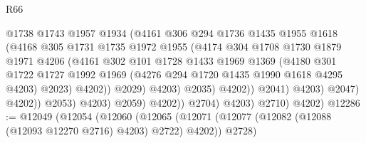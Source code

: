 \begin{lexlean}{R66}
\begin{coremodule}
                                      @1738
                                      @1743
                                      @1957
                                      @1934
                                      (@4161
                                        @306
                                        @294
                                        @1736
                                        @1435
                                        @1955
                                        @1618
                                        (@4168
                                          @305
                                          @1731
                                          @1735
                                          @1972
                                          @1955
                                          (@4174
                                            @304
                                            @1708
                                            @1730
                                            @1879
                                            @1971
                                            @4206
                                            (@4161
                                              @302
                                              @101
                                              @1728
                                              @1433
                                              @1969
                                              @1369
                                              (@4180
                                                @301
                                                @1722
                                                @1727
                                                @1992
                                                @1969
                                                (@4276 @294 @1720 @1435 @1990 @1618 @4295 @4203)
                                                @2023)
                                              @4202))
                                          @2029)
                                        @4203)
                                      @2035)
                                    @4202))
                                @2041)
                              @4203)
                            @2047)
                          @4202))
                      @2053)
                    @4203)
                  @2059)
                @4202))
            @2704)
          @4203)
        @2710)
      @4202)
@12286 := @12049
    (@12054
      (@12060
        (@12065 (@12071 (@12077 (@12082 (@12088 (@12093 @12270 @2716) @4203) @2722) @4202)) @2728)

\end{coremodule}
\end{lexlean}
